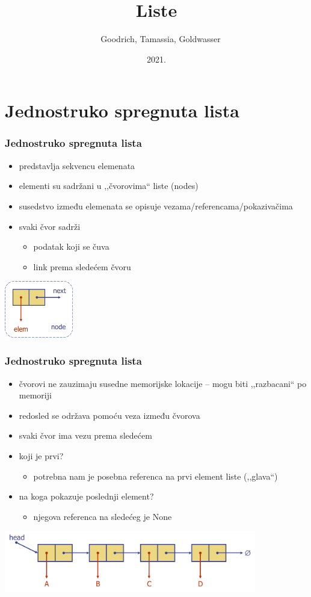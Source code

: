 \documentclass[compress,aspectratio=169]{beamer}
\title{Liste}
\author{\textcopyright \ \ Goodrich, Tamassia, Goldwasser}
\institute{Katedra za informatiku, Fakultet tehničkih nauka, Univerzitet u
Novom Sadu}
\date{2021.}
\begin{document}
\frame{\titlepage}

\section[1-Lista]{Jednostruko spregnuta lista}
\begin{frame}[fragile]
  \frametitle{Jednostruko spregnuta lista}
  \begin{itemize}
    \item predstavlja sekvencu elemenata
    \item elementi su sadržani u ,,čvorovima`` liste (nodes)
    \item susedstvo između elemenata se opisuje vezama/referencama/pokazivačima
    \item svaki čvor sadrži
    \begin{itemize}
      \item podatak koji se čuva
      \item link prema sledećem čvoru
    \end{itemize}
  \end{itemize}
  \begin{center}
    \includegraphics[width=3cm]{asp-07-pic01.png}
  \end{center}
\end{frame}

\begin{frame}[fragile]
  \frametitle{Jednostruko spregnuta lista}
  \begin{itemize}
    \item čvorovi ne zauzimaju susedne memorijske lokacije -- mogu biti ,,razbacani`` po memoriji
    \item redosled se održava pomoću veza između čvorova
    \item svaki čvor ima vezu prema sledećem
    \item koji je prvi?
    \begin{itemize}
      \item potrebna nam je posebna referenca na prvi element liste (,,glava``)
    \end{itemize}
    \item na koga pokazuje poslednji element?
    \begin{itemize}
      \item njegova referenca na sledećeg je None
    \end{itemize}
  \end{itemize}
  \begin{center}
    \includegraphics[width=11cm]{asp-07-pic02.png}
  \end{center}
\end{frame}
\end{document}
